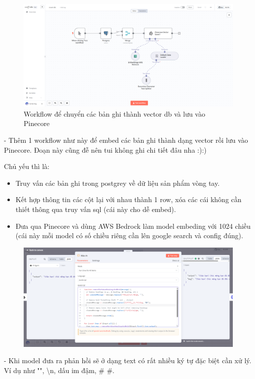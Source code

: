 \begin{figure}[htbp]
    \centering
    \includegraphics[width=1\linewidth]{Chap1-7/insertdb.pdf}
    \caption{Workflow để chuyển các bản ghi thành vector db và lưu vào Pinecore}
\end{figure}

- Thêm 1 workflow như này để embed các bản ghi thành dạng vector rồi lưu vào Pinecore. Đoạn này cũng đễ nên tui không ghi chi tiết đâu nha :):)

Chủ yếu thì là:


\begin{itemize}
    \item Truy vấn các bản ghi trong postgrey về dữ liệu sản phẩm vòng tay.
    \item Kết hợp thông tin các cột lại với nhau thành 1 row, xóa các cái không cần thiết thông qua truy vấn sql (cái này cho dễ embed).
    \item Đưa qua Pinecore và dùng AWS Bedrock làm model embeding với 1024 chiều (cái này mỗi model có số chiều riêng cần lên google search và config đúng). 
\end{itemize}

\begin{figure}[htbp]
    \centering
    \includegraphics[width=1\linewidth]{Chap1-7/code-function-cleand.pdf}
\end{figure}
- Khi model đưa ra phản hồi sẽ ở dạng text có rất nhiều ký tự đặc biệt cần xử lý. Ví dụ như "", \textbackslash n, dấu im đậm, \# \#.

